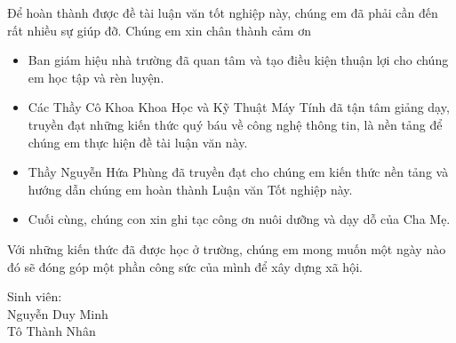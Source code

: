 \documentclass[12pt,a4paper,oneside]{book} %
\begin{document}
\begin{acknowledgments}
Để hoàn thành được đề tài luận văn tốt nghiệp này, chúng em đã phải cần đến rất nhiều sự giúp đỡ. Chúng em xin chân thành cảm ơn
\begin{itemize}
	\item Ban giám hiệu nhà trường đã quan tâm và tạo điều kiện thuận lợi cho chúng em học tập và rèn luyện.
	\item Các Thầy Cô Khoa Khoa Học và Kỹ Thuật Máy Tính đã tận tâm giảng dạy, truyền đạt những kiến thức quý báu về công nghệ thông tin, là nền tảng để chúng em thực hiện đề tài luận văn này.
	\item Thầy Nguyễn Hứa Phùng đã truyền đạt cho chúng em kiến thức nền tảng và hướng dẫn chúng em hoàn thành Luận văn Tốt nghiệp này.
	\item Cuối cùng, chúng con xin ghi tạc công ơn nuôi dưỡng và dạy dỗ của Cha Mẹ.
\end{itemize}
Với những kiến thức đã được học ở trường, chúng em mong muốn một ngày nào đó sẽ đóng góp một phần công sức của mình để xây dựng xã hội.
\vspace{1cm}
\begin{flushright}
Sinh viên:\\
Nguyễn Duy Minh\\
Tô Thành Nhân\\
\end{flushright}

\end{acknowledgments}

%
\begin{abstract}
\end{abstract}	
	
\tableofcontents
\newpage
\listoftables
\newpage
\listoffigures


\mainmatter

\fancyhead{}  %
\renewcommand{\footrulewidth}{0.4pt}

\pagestyle{fancy}  %








\end{document}
